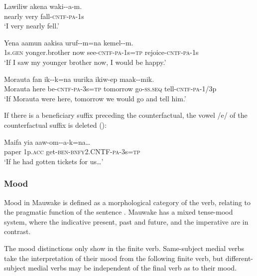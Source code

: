 \ea%
\label{ex:x234}
\gll Lawiliw akena waki--a-m. \\
nearly very fall-\textsc{cntf}-\textsc{pa}-1s \\
\glt`I very nearly fell.' 
\z

\ea%
\label{ex:x433}
\gll Yena aamun aakisa uruf--m=na kemel--m. \\
1s.\textsc{gen} yonger.brother now see-\textsc{cntf}-\textsc{pa}-1s=\textsc{tp} rejoice-\textsc{cntf}-\textsc{pa}-1s\\
\glt`If I saw my younger brother now, I would be happy.'
\z

\ea%
\label{ex:x434}
\gll Morauta fan ik--k=na uurika ikiw-ep maak--mik.\\
Morauta here be-\textsc{cntf}-\textsc{pa}-3s=\textsc{tp} tomorrow go-\textsc{ss}.\textsc{seq} tell-\textsc{cntf}-\textsc{pa}-1/3p\\
\glt`If Morauta were here, tomorrow we would go and tell him.'
\z

If there is a beneficiary suffix  preceding the counterfactual, the vowel /e/ of the counterfactual suffix is deleted ():

\ea%
\label{ex:x235}
\gll Maifa yia aaw-om--a-k=na{\dots} \\
paper 1p.\textsc{acc} get-\textsc{ben}-\textsc{bnfy}2.CNTF-\textsc{pa}-3s=\textsc{tp} \\
\glt`If he had gotten tickets for us{\dots}'
\z

\subsubsection[Mood]{Mood}
{}
Mood in Mauwake is defined as a morphological category of the verb, relating to the pragmatic function of the sentence \citep[cf.][21]{Palmer1986}. Mauwake has a mixed tense-mood system, where the indicative present, past and future, and the imperative are in contrast. 

The mood distinctions only show in the finite verb. Same-subject medial verbs take the interpretation of their mood from the following finite verb, but different-subject medial verbs may be independent of the final verb as to their mood.

